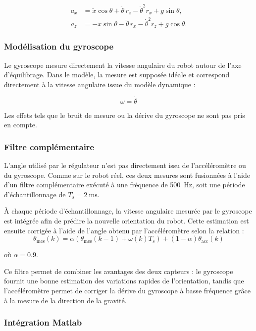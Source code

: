 \begin{align}
a_x &=
\ddot{x}\cos\theta
+\ddot{\theta}\,r_z
-\dot{\theta}^{2}r_x
+g\sin\theta,\\
a_z &=
-\ddot{x}\sin\theta
-\ddot{\theta}\,r_x
-\dot{\theta}^{2}r_z
+g\cos\theta.
\end{align}

\subsubsection{Modélisation du gyroscope}

Le gyroscope mesure directement la vitesse angulaire du robot autour de l'axe d'équilibrage. Dans le modèle, la mesure est supposée idéale et correspond directement à la vitesse angulaire issue du modèle dynamique :

$$
\omega = \dot{\theta}
$$

Les effets tels que le bruit de mesure ou la dérive du gyroscope ne sont pas pris en compte.

\subsubsection{Filtre complémentaire}

L'angle utilisé par le régulateur n'est pas directement issu de l'accéléromètre ou du gyroscope. Comme sur le robot réel, ces deux mesures sont fusionnées à l'aide d'un filtre complémentaire exécuté à une fréquence de 500~Hz, soit une période d'échantillonnage de $T_s = 2~\mathrm{ms}$.

À chaque période d'échantillonnage, la vitesse angulaire mesurée par le gyroscope est intégrée afin de prédire la nouvelle orientation du robot. Cette estimation est ensuite corrigée à l'aide de l'angle obtenu par l'accéléromètre selon la relation :
$$
\theta_{\mathrm{mes}}(k)
=
\alpha
\left(
\theta_{\mathrm{mes}}(k-1)
+
\omega(k)T_s
\right)
+
(1-\alpha)\theta_{\mathrm{acc}}(k)
$$

où $\alpha = 0.9$.

Ce filtre permet de combiner les avantages des deux capteurs : le gyroscope fournit une bonne estimation des variations rapides de l'orientation, tandis que l'accéléromètre permet de corriger la dérive du gyroscope à basse fréquence grâce à la mesure de la direction de la gravité.

\subsubsection{Intégration Matlab}

